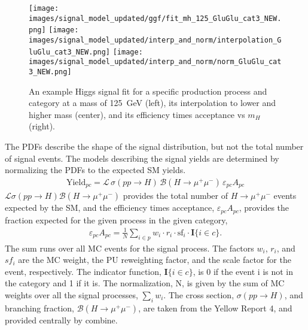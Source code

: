 \begin{figure}[h!]
    \centering
    \texttt{[image: images/signal\_model\_updated/ggf/fit\_mh\_125\_GluGlu\_cat3\_NEW.png]}
    \texttt{[image: images/signal\_model\_updated/interp\_and\_norm/interpolation\_GluGlu\_cat3\_NEW.png]}
    \texttt{[image: images/signal\_model\_updated/interp\_and\_norm/norm\_GluGlu\_cat3\_NEW.png]}
    \caption[An example of the signal model.]
    {An example Higgs signal fit for a specific production
    process and category at a mass of 125~GeV (left), its
    interpolation to lower and higher mass (center), and its efficiency times
    acceptance vs $m_H$ (right).}
    \label{sigmodel:gaus}
\end{figure}
The PDFs describe the shape of the signal distribution, but not the total number of signal events. The models describing the signal yields are determined by normalizing the PDFs to the expected SM yields. 
\begin{align}
        \label{eq:expectedYield}
        \text{Yield}_{pc} = \mathcal{L}\,\sigma(pp\rightarrow H)\, \mathcal{B}(H\rightarrow\mu^+\mu^-) \, \varepsilon_{pc}A_{pc}
\end{align}
$\mathcal{L}\sigma(pp\rightarrow H)\mathcal{B}(H\rightarrow\mu^+\mu^-)$ provides the total number of $H\rightarrow\mu^+\mu^-$ events expected by the SM, and the efficiency times acceptance, $\varepsilon_{pc} A_{pc}$, provides the fraction expected for the given process in the given category, 
\begin{align}
\varepsilon_{pc} A_{pc} = \frac{1}{N}\sum_{i \in p} w_{i} \cdot r_{i} \cdot \text{sf}_i \cdot \mathbf{I}\{i \in c\}.
\end{align}
The sum runs over all MC events for the signal process. The factors $w_i$, $r_i$, and $sf_i$ are the MC weight, the PU reweighting factor, and the scale factor for the event, respectively. The indicator function, $\mathbf{I}\{i \in c\}$, is 0 if the event i is not in the category and 1 if it is. The normalization, N, is given by the sum of MC weights over all the signal processes, $\sum_{i}w_{i}$. The cross section, $\sigma(pp\rightarrow H)$, and branching fraction, $\mathcal{B}(H\rightarrow\mu^+\mu^-)$, are taken from the Yellow Report 4, and provided centrally by combine.

